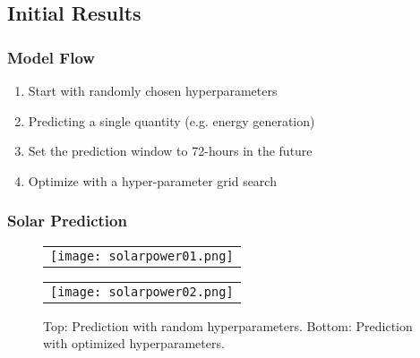 \subsection{Initial Results}
\begin{frame}
  \frametitle{Model Flow}
  \begin{enumerate}
    \item Start with randomly chosen hyperparameters
    \item Predicting a single quantity (e.g. energy generation)
    \item Set the prediction window to 72-hours in the future
    \item Optimize with a hyper-parameter grid search
  \end{enumerate}
\end{frame}

\begin{frame}
  \frametitle{Solar Prediction}
  \begin{figure}
  \centering
  \begin{tabular}{@{}c@{}}
    \texttt{[image: solarpower01.png]}
  \end{tabular}

  \begin{tabular}{@{}c@{}}
    \texttt{[image: solarpower02.png]}
  \end{tabular}

  \caption{Top: Prediction with random hyperparameters. Bottom: Prediction with optimized hyperparameters.}\label{fig:myfig}
\end{figure}
\end{frame}

